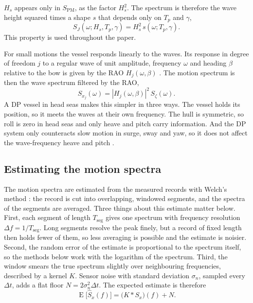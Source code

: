\documentclass[10pt,a4paper,twocolumn,twoside]{article}
\newcommand{\Hs}{H_{s}}
\newcommand{\Tp}{T_{p}}
\begin{document}
$\Hs$ appears only in $S_{\mathrm{PM}}$, as the factor $\Hs^2$. The spectrum is therefore the wave
height squared times a shape $s$ that depends only on $\Tp$ and $\gamma$,
\begin{equation}
S_J(\omega; \Hs, \Tp, \gamma) = \Hs^2\, s(\omega; \Tp, \gamma).
\label{eq:hs_scaling}
\end{equation}
This property is used throughout the paper.

For small motions the vessel responds linearly to the waves. Its response in degree of freedom $j$
to a regular wave of unit amplitude, frequency $\omega$ and heading $\beta$ relative to the bow is
given by the RAO $H_j(\omega,\beta)$ \citep{faltinsen1990}. The motion spectrum is then the wave
spectrum filtered by the RAO,
\begin{equation}
S_{x_j}(\omega) = |H_j(\omega, \beta)|^2\, S_\zeta(\omega).
\label{eq:response}
\end{equation}
A DP vessel in head seas makes this simpler in three ways. The vessel holds its position, so it
meets the waves at their own frequency. The hull is symmetric, so roll is zero in head seas and
only heave and pitch carry information. And the DP system only counteracts slow motion in surge,
sway and yaw, so it does not affect the wave-frequency heave and pitch \citep{fossen2021}.

\subsection{Estimating the motion spectra}
\label{sec:theory_welch}

The motion spectra are estimated from the measured records with Welch's method
\citep{welch1967}: the record is cut into overlapping, windowed segments, and the spectra of the
segments are averaged. Three things about this estimate matter below. First, each segment of length $T_{\mathrm{seg}}$
gives one spectrum with frequency resolution $\Delta f = 1/T_{\mathrm{seg}}$. Long segments
resolve the peak finely, but a record of fixed length then holds fewer of them, so less averaging is
possible and the estimate is noisier. Second, the random error of the estimate is proportional to the spectrum itself, so the methods
below work with the logarithm of the spectrum. Third, the window smears the true spectrum slightly over
neighbouring frequencies, described by a kernel $K$. Sensor noise with standard deviation
$\sigma_n$, sampled every $\Delta t$, adds a flat floor $N = 2\sigma_n^2\Delta t$. The expected
estimate is therefore
\begin{equation}
\operatorname{E}\big[\hat S_x(f)\big] = \big(K * S_x\big)(f) + N.
\label{eq:welch}
\end{equation}
\end{document}
